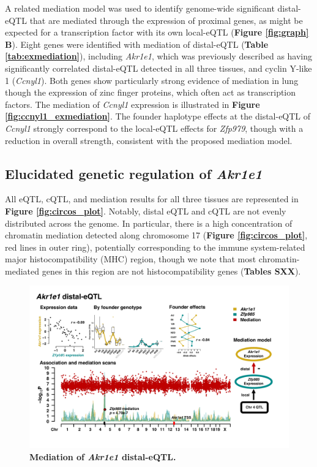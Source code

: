 A related mediation model was used to identify genome-wide significant distal-eQTL that are mediated through the expression of proximal genes, as might be expected for a transcription factor with its own local-eQTL (\textbf{Figure \ref{fig:graph} B}). Eight genes were identified with mediation of distal-eQTL (\textbf{Table \ref{tab:exmediation}}), including \textit{Akr1e1}, which was previously described as having significantly correlated distal-eQTL detected in all three tissues, and cyclin Y-like 1 (\textit{Ccnyl1}). Both genes show particularly strong evidence of mediation in lung though the expression of zinc finger proteins, which often act as transcription factors. The mediation of \textit{Ccnyl1} expression is illustrated in \textbf{Figure \ref{fig:ccnyl1_exmediation}}. The founder haplotype effects at the distal-eQTL of \textit{Ccnyl1} strongly correspond to the local-eQTL effects for \textit{Zfp979}, though with a reduction in overall strength, consistent with the proposed mediation model.

\subsection{Elucidated genetic regulation of \textit{Akr1e1}}

All eQTL, cQTL, and mediation results for all three tissues are represented in \textbf{Figure \ref{fig:circos_plot}}. Notably, distal eQTL and cQTL are not evenly distributed across the genome. In particular, there is a high concentration of chromatin mediation detected along chromosome 17 (\textbf{Figure \ref{fig:circos_plot}}, red lines in outer ring), potentially corresponding to the immune system-related major histocompatibility (MHC) region, though we note that most chromatin-mediated genes in this region are not histocompatibility genes (\textbf{Tables SXX}).

\begin{figure}[hp]
\renewcommand{\familydefault}{\sfdefault}\normalfont
\centering
\includegraphics[width=\textwidth, trim={0in 0.5in 0in 0in}, clip]{figs/akr1e1_mediation.pdf}
\caption{\textbf{Mediation of \textit{Akr1e1} distal-eQTL.} \label{fig:akr1e1_exmediation}}
\end{figure}


